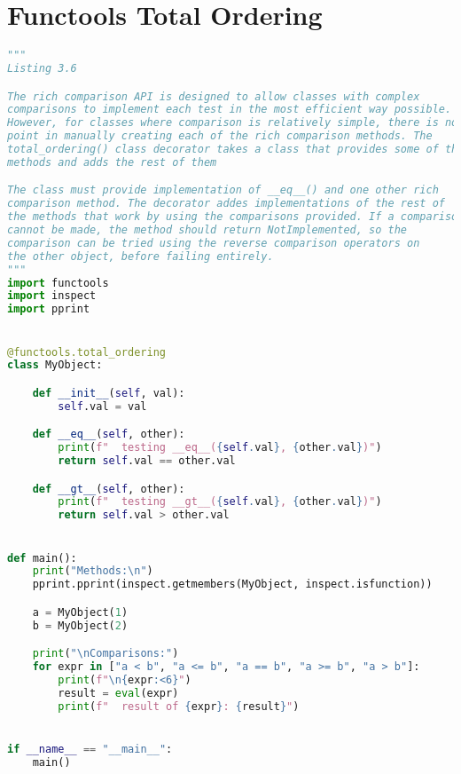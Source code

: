 \documentclass[a4paper,landscape]{report}
\begin{document}
\section{Functools Total Ordering}
\begin{lstlisting}[language=Python]
"""
Listing 3.6

The rich comparison API is designed to allow classes with complex
comparisons to implement each test in the most efficient way possible.
However, for classes where comparison is relatively simple, there is no
point in manually creating each of the rich comparison methods. The
total_ordering() class decorator takes a class that provides some of the
methods and adds the rest of them

The class must provide implementation of __eq__() and one other rich
comparison method. The decorator addes implementations of the rest of
the methods that work by using the comparisons provided. If a comparison
cannot be made, the method should return NotImplemented, so the
comparison can be tried using the reverse comparison operators on
the other object, before failing entirely.
"""
import functools
import inspect
import pprint


@functools.total_ordering
class MyObject:

    def __init__(self, val):
        self.val = val

    def __eq__(self, other):
        print(f"  testing __eq__({self.val}, {other.val})")
        return self.val == other.val

    def __gt__(self, other):
        print(f"  testing __gt__({self.val}, {other.val})")
        return self.val > other.val


def main():
    print("Methods:\n")
    pprint.pprint(inspect.getmembers(MyObject, inspect.isfunction))

    a = MyObject(1)
    b = MyObject(2)

    print("\nComparisons:")
    for expr in ["a < b", "a <= b", "a == b", "a >= b", "a > b"]:
        print(f"\n{expr:<6}")
        result = eval(expr)
        print(f"  result of {expr}: {result}")


if __name__ == "__main__":
    main()

\end{lstlisting}
\end{document}
